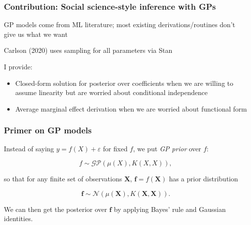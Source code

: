 \documentclass{beamer}
\begin{document}
\begin{frame}
    \frametitle{Contribution: Social science-style inference with GPs}
    GP models come from ML literature; most existing derivations/routines don't give us what we want
    \pause

    \vspace{\baselineskip}
    Carlson (2020) uses sampling for all parameters via Stan
    \pause

    \vspace{\baselineskip}
    I provide:
    \begin{itemize}
        \item Closed-form solution for posterior over coefficients when we are willing to assume linearity but are worried about conditional independence
        \item Average marginal effect derivation when we are worried about functional form
    \end{itemize}
\end{frame}

\begin{frame}
    \frametitle{Primer on GP models}
    Instead of saying \( y = f \left( X \right) + \varepsilon \) for fixed \( f \), we put \textit{GP prior} over \( f \):

    \[
        f \sim \mathcal{GP} \left( \mu \left( X \right), K \left( X, X \right) \right),
    \]

    so that for any finite set of observations $\mathbf{X}$,
    \( \mathbf{f} = f \left( \mathbf{X} \right) \) has a prior distribution

    \[
        \mathbf{f} \sim \mathcal{N} \left( \mu \left( \mathbf{X} \right), K \left( \mathbf{X}, \mathbf{X} \right) \right).
    \]

    We can then get the posterior over \( \mathbf{f} \) by applying Bayes' rule and Gaussian identities.
\end{frame}
\end{document}

